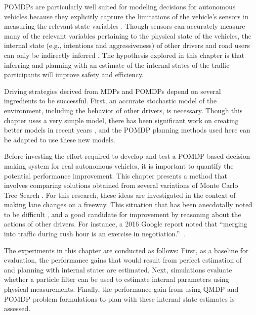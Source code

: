 POMDPs are particularly well suited for modeling decisions for autonomous vehicles because they explicitly capture the limitations of the vehicle's sensors in measuring the relevant state variables \cite{brechtel2013mcvi, sadigh2016gathering, bai2015intention}.
Though sensors can accurately measure many of the relevant variables pertaining to the physical state of the vehicles, the internal state (e.g., intentions and aggressiveness) of other drivers and road users can only be indirectly inferred \cite{sadigh2016gathering, bai2015intention, lam2015, dc2015}.
The hypothesis explored in this chapter is that inferring and planning with an estimate of the internal states of the traffic participants will improve safety and efficiency.

Driving strategies derived from MDPs and POMDPs depend on several ingredients to be successful.
First, an accurate stochastic model of the environment, including the behavior of other drivers, is necessary. 
Though this chapter uses a very simple model, there has been significant work on creating better models in recent years \cite{grindele2015trafficmodel, WheelerRobbelKochenderfer2015, sadigh2014}, and the POMDP planning methods used here can be adapted to use these new models.

Before investing the effort required to develop and test a POMDP-based decision making system for real autonomous vehicles, it is important to quantify the potential performance improvement.
This chapter presents a method that involves comparing solutions obtained from several variations of Monte Carlo Tree Search \cite{browne2012survey}.
For this research, these ideas are investigated in the context of making lane changes on a freeway.
This situation that has been anecdotally noted to be difficult \cite{naughton2015freeway}, and a good candidate for improvement by reasoning about the actions of other drivers.
For instance, a 2016 Google report noted that ``merging into traffic during rush hour is an exercise in negotiation.''~\cite{dolgov2016google}.

The experiments in this chapter are conducted as follows:
First, as a baseline for evaluation, the performance gains that would result from perfect estimation of and planning with internal states are estimated.
Next, simulations evaluate whether a particle filter can be used to estimate internal parameters using physical measurements.
Finally, the performance gain from using QMDP and POMDP problem formulations to plan with these internal state estimates is assessed.

